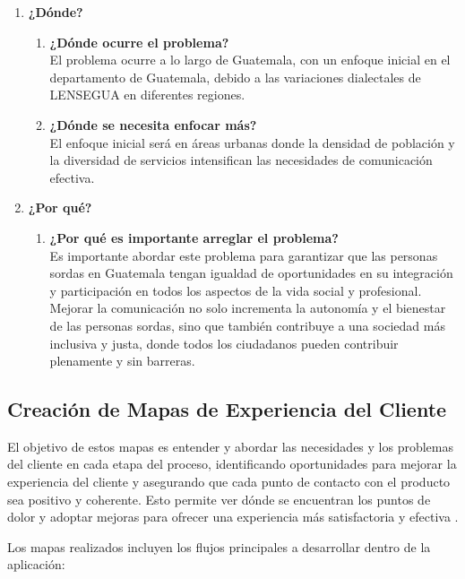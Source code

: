 \begin{enumerate}
    \item \textbf{¿Dónde?}
    \begin{enumerate}
        \item \textbf{¿Dónde ocurre el problema?} \\
        El problema ocurre a lo largo de Guatemala, con un enfoque inicial en el departamento de Guatemala, debido a las variaciones dialectales de LENSEGUA en diferentes regiones.
        \item \textbf{¿Dónde se necesita enfocar más?} \\
        El enfoque inicial será en áreas urbanas donde la densidad de población y la diversidad de servicios intensifican las necesidades de comunicación efectiva.
    \end{enumerate}

    \item \textbf{¿Por qué?}
    \begin{enumerate}
        \item \textbf{¿Por qué es importante arreglar el problema?} \\
        Es importante abordar este problema para garantizar que las personas sordas en Guatemala tengan igualdad de oportunidades en su integración y participación en todos los aspectos de la vida social y profesional. Mejorar la comunicación no solo incrementa la autonomía y el bienestar de las personas sordas, sino que también contribuye a una sociedad más inclusiva y justa, donde todos los ciudadanos pueden contribuir plenamente y sin barreras.
    \end{enumerate}
\end{enumerate}


\subsection{Creación de Mapas de Experiencia del Cliente}

El objetivo de estos mapas es entender y abordar las necesidades y los problemas del cliente en cada etapa del proceso, identificando oportunidades para mejorar la experiencia del cliente y asegurando que cada punto de contacto con el producto sea positivo y coherente. Esto permite ver dónde se encuentran los puntos de dolor y adoptar mejoras para ofrecer una experiencia más satisfactoria y efectiva \cite{Hamond2024}.

Los mapas realizados incluyen los flujos principales a desarrollar dentro de la aplicación: 


